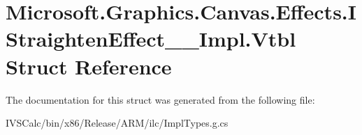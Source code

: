 \hypertarget{struct_microsoft_1_1_graphics_1_1_canvas_1_1_effects_1_1_i_straighten_effect_____impl_1_1_vtbl}{}\section{Microsoft.\+Graphics.\+Canvas.\+Effects.\+I\+Straighten\+Effect\+\_\+\+\_\+\+Impl.\+Vtbl Struct Reference}
\label{struct_microsoft_1_1_graphics_1_1_canvas_1_1_effects_1_1_i_straighten_effect_____impl_1_1_vtbl}


The documentation for this struct was generated from the following file\+:\begin{DoxyCompactItemize}
\item 
I\+V\+S\+Calc/bin/x86/\+Release/\+A\+R\+M/ilc/Impl\+Types.\+g.\+cs\end{DoxyCompactItemize}
